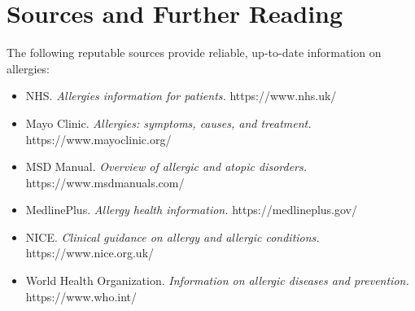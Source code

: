 \section*{Sources and Further Reading}
The following reputable sources provide reliable, up-to-date information on allergies:

\begin{itemize}
    \item NHS. \textit{Allergies information for patients.} https://www.nhs.uk/
    \item Mayo Clinic. \textit{Allergies: symptoms, causes, and treatment.} https://www.mayoclinic.org/
    \item MSD Manual. \textit{Overview of allergic and atopic disorders.} https://www.msdmanuals.com/
    \item MedlinePlus. \textit{Allergy health information.} https://medlineplus.gov/
    \item NICE. \textit{Clinical guidance on allergy and allergic conditions.} https://www.nice.org.uk/
    \item World Health Organization. \textit{Information on allergic diseases and prevention.} https://www.who.int/
\end{itemize}
